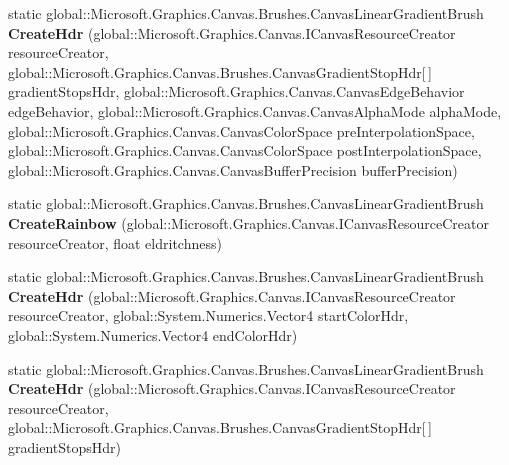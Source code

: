 \begin{DoxyCompactItemize}
static global\+::\+Microsoft.\+Graphics.\+Canvas.\+Brushes.\+Canvas\+Linear\+Gradient\+Brush {\bfseries Create\+Hdr} (global\+::\+Microsoft.\+Graphics.\+Canvas.\+I\+Canvas\+Resource\+Creator resource\+Creator, global\+::\+Microsoft.\+Graphics.\+Canvas.\+Brushes.\+Canvas\+Gradient\+Stop\+Hdr\mbox{[}$\,$\mbox{]} gradient\+Stops\+Hdr, global\+::\+Microsoft.\+Graphics.\+Canvas.\+Canvas\+Edge\+Behavior edge\+Behavior, global\+::\+Microsoft.\+Graphics.\+Canvas.\+Canvas\+Alpha\+Mode alpha\+Mode, global\+::\+Microsoft.\+Graphics.\+Canvas.\+Canvas\+Color\+Space pre\+Interpolation\+Space, global\+::\+Microsoft.\+Graphics.\+Canvas.\+Canvas\+Color\+Space post\+Interpolation\+Space, global\+::\+Microsoft.\+Graphics.\+Canvas.\+Canvas\+Buffer\+Precision buffer\+Precision)
\item 
\mbox{\label{class_microsoft_1_1_graphics_1_1_canvas_1_1_brushes_1_1_canvas_linear_gradient_brush_a521b2a32aa6e7539839397dae253b7a8}} 
static global\+::\+Microsoft.\+Graphics.\+Canvas.\+Brushes.\+Canvas\+Linear\+Gradient\+Brush {\bfseries Create\+Rainbow} (global\+::\+Microsoft.\+Graphics.\+Canvas.\+I\+Canvas\+Resource\+Creator resource\+Creator, float eldritchness)
\item 
\mbox{\label{class_microsoft_1_1_graphics_1_1_canvas_1_1_brushes_1_1_canvas_linear_gradient_brush_a1164597be8c9b0ac875ac18fdb1f8965}} 
static global\+::\+Microsoft.\+Graphics.\+Canvas.\+Brushes.\+Canvas\+Linear\+Gradient\+Brush {\bfseries Create\+Hdr} (global\+::\+Microsoft.\+Graphics.\+Canvas.\+I\+Canvas\+Resource\+Creator resource\+Creator, global\+::\+System.\+Numerics.\+Vector4 start\+Color\+Hdr, global\+::\+System.\+Numerics.\+Vector4 end\+Color\+Hdr)
\item 
\mbox{\label{class_microsoft_1_1_graphics_1_1_canvas_1_1_brushes_1_1_canvas_linear_gradient_brush_a5aac477d60f1a54fac610c89d85f7c46}} 
static global\+::\+Microsoft.\+Graphics.\+Canvas.\+Brushes.\+Canvas\+Linear\+Gradient\+Brush {\bfseries Create\+Hdr} (global\+::\+Microsoft.\+Graphics.\+Canvas.\+I\+Canvas\+Resource\+Creator resource\+Creator, global\+::\+Microsoft.\+Graphics.\+Canvas.\+Brushes.\+Canvas\+Gradient\+Stop\+Hdr\mbox{[}$\,$\mbox{]} gradient\+Stops\+Hdr)

\end{DoxyCompactItemize}
